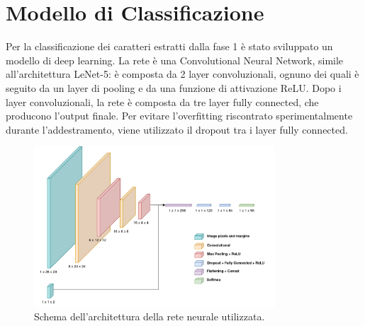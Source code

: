 \chapter{Modello di Classificazione}\label{cap:modello}

Per la classificazione dei caratteri estratti dalla fase 1 è stato sviluppato un modello di deep learning. La rete è una Convolutional Neural Network, simile all'architettura LeNet-5: è composta da 2 layer convoluzionali, ognuno dei quali è seguito da un layer di pooling e da una funzione di attivazione ReLU. Dopo i layer convoluzionali, la rete è composta da tre layer fully connected, che producono l'output finale. Per evitare l'overfitting riscontrato sperimentalmente durante l'addestramento, viene utilizzato il dropout tra i layer fully connected.

\begin{figure}[H]
	\centering
	\includegraphics[width=0.8\textwidth]{assets/network.jpg}
	\caption{Schema dell'architettura della rete neurale utilizzata.}
	\label{fig:modello-schema}
\end{figure}
